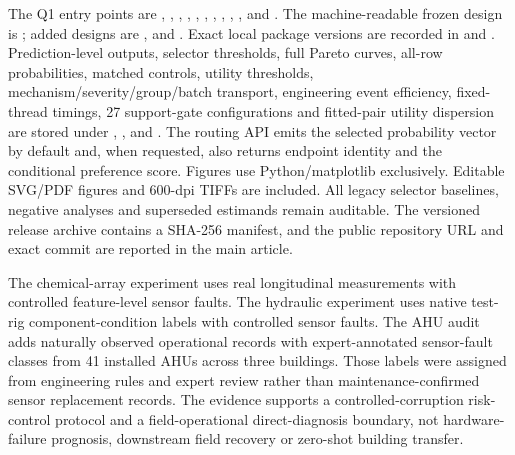 \documentclass[10pt]{article}
\begin{document}
The Q1 entry points are , , , , , , , , , ,  and . The machine-readable frozen design is ; added designs are ,  and . Exact local package versions are recorded in  and . Prediction-level outputs, selector thresholds, full Pareto curves, all-row probabilities, matched controls, utility thresholds, mechanism/severity/group/batch transport, engineering event efficiency, fixed-thread timings, 27 support-gate configurations and fitted-pair utility dispersion are stored under , ,  and . The routing API emits the selected probability vector by default and, when requested, also returns endpoint identity and the conditional preference score. Figures use Python/matplotlib exclusively. Editable SVG/PDF figures and 600-dpi TIFFs are included. All legacy selector baselines, negative analyses and superseded estimands remain auditable. The versioned release archive contains a SHA-256 manifest, and the public repository URL and exact commit are reported in the main article.

The chemical-array experiment uses real longitudinal measurements with controlled feature-level sensor faults. The hydraulic experiment uses native test-rig component-condition labels with controlled sensor faults. The AHU audit adds naturally observed operational records with expert-annotated sensor-fault classes from 41 installed AHUs across three buildings. Those labels were assigned from engineering rules and expert review rather than maintenance-confirmed sensor replacement records. The evidence supports a controlled-corruption risk-control protocol and a field-operational direct-diagnosis boundary, not hardware-failure prognosis, downstream field recovery or zero-shot building transfer.
\end{document}
